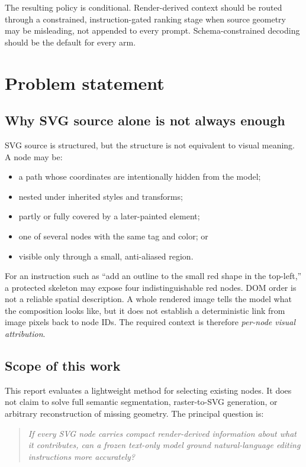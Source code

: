 \documentclass[10pt,a4paper]{article}
\newcommand{\code}[1]{\texttt{\detokenize{#1}}}
\begin{document}
The resulting policy is conditional. Render-derived context should be routed
through a constrained, instruction-gated ranking stage when source geometry
may be misleading, not appended to every prompt. Schema-constrained decoding
should be the default for every arm.

\section{Problem statement}

\subsection{Why SVG source alone is not always enough}

SVG source is structured, but the structure is not equivalent to visual
meaning. A node may be:

\begin{itemize}
  \item a path whose coordinates are intentionally hidden from the model;
  \item nested under inherited styles and transforms;
  \item partly or fully covered by a later-painted element;
  \item one of several nodes with the same tag and color; or
  \item visible only through a small, anti-aliased region.
\end{itemize}

For an instruction such as ``add an outline to the small red shape in the
top-left,'' a protected skeleton may expose four indistinguishable red
\code{path} nodes. DOM order is not a reliable spatial description. A whole
rendered image tells the model what the composition looks like, but it does not
establish a deterministic link from image pixels back to node IDs. The required
context is therefore \emph{per-node visual attribution}.

\subsection{Scope of this work}

This report evaluates a lightweight method for selecting existing nodes. It
does not claim to solve full semantic segmentation, raster-to-SVG generation,
or arbitrary reconstruction of missing geometry. The principal question is:

\begin{quote}
\emph{If every SVG node carries compact render-derived information about what
it contributes, can a frozen text-only model ground natural-language editing
instructions more accurately?}
\end{quote}
\end{document}
